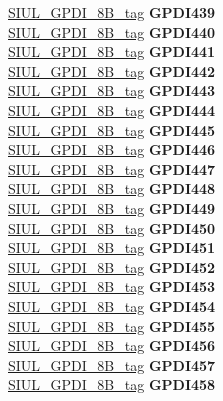 \begin{DoxyCompactItemize}
\begin{tabbing}
\>\>\mbox{\hyperlink{unionSIUL__GPDI__8B__tag}{SIUL\_GPDI\_8B\_tag}} {\bfseries GPDI439}\\
\>\>\mbox{\hyperlink{unionSIUL__GPDI__8B__tag}{SIUL\_GPDI\_8B\_tag}} {\bfseries GPDI440}\\
\>\>\mbox{\hyperlink{unionSIUL__GPDI__8B__tag}{SIUL\_GPDI\_8B\_tag}} {\bfseries GPDI441}\\
\>\>\mbox{\hyperlink{unionSIUL__GPDI__8B__tag}{SIUL\_GPDI\_8B\_tag}} {\bfseries GPDI442}\\
\>\>\mbox{\hyperlink{unionSIUL__GPDI__8B__tag}{SIUL\_GPDI\_8B\_tag}} {\bfseries GPDI443}\\
\>\>\mbox{\hyperlink{unionSIUL__GPDI__8B__tag}{SIUL\_GPDI\_8B\_tag}} {\bfseries GPDI444}\\
\>\>\mbox{\hyperlink{unionSIUL__GPDI__8B__tag}{SIUL\_GPDI\_8B\_tag}} {\bfseries GPDI445}\\
\>\>\mbox{\hyperlink{unionSIUL__GPDI__8B__tag}{SIUL\_GPDI\_8B\_tag}} {\bfseries GPDI446}\\
\>\>\mbox{\hyperlink{unionSIUL__GPDI__8B__tag}{SIUL\_GPDI\_8B\_tag}} {\bfseries GPDI447}\\
\>\>\mbox{\hyperlink{unionSIUL__GPDI__8B__tag}{SIUL\_GPDI\_8B\_tag}} {\bfseries GPDI448}\\
\>\>\mbox{\hyperlink{unionSIUL__GPDI__8B__tag}{SIUL\_GPDI\_8B\_tag}} {\bfseries GPDI449}\\
\>\>\mbox{\hyperlink{unionSIUL__GPDI__8B__tag}{SIUL\_GPDI\_8B\_tag}} {\bfseries GPDI450}\\
\>\>\mbox{\hyperlink{unionSIUL__GPDI__8B__tag}{SIUL\_GPDI\_8B\_tag}} {\bfseries GPDI451}\\
\>\>\mbox{\hyperlink{unionSIUL__GPDI__8B__tag}{SIUL\_GPDI\_8B\_tag}} {\bfseries GPDI452}\\
\>\>\mbox{\hyperlink{unionSIUL__GPDI__8B__tag}{SIUL\_GPDI\_8B\_tag}} {\bfseries GPDI453}\\
\>\>\mbox{\hyperlink{unionSIUL__GPDI__8B__tag}{SIUL\_GPDI\_8B\_tag}} {\bfseries GPDI454}\\
\>\>\mbox{\hyperlink{unionSIUL__GPDI__8B__tag}{SIUL\_GPDI\_8B\_tag}} {\bfseries GPDI455}\\
\>\>\mbox{\hyperlink{unionSIUL__GPDI__8B__tag}{SIUL\_GPDI\_8B\_tag}} {\bfseries GPDI456}\\
\>\>\mbox{\hyperlink{unionSIUL__GPDI__8B__tag}{SIUL\_GPDI\_8B\_tag}} {\bfseries GPDI457}\\
\>\>\mbox{\hyperlink{unionSIUL__GPDI__8B__tag}{SIUL\_GPDI\_8B\_tag}} {\bfseries GPDI458}\\

\end{tabbing}
\end{DoxyCompactItemize}

